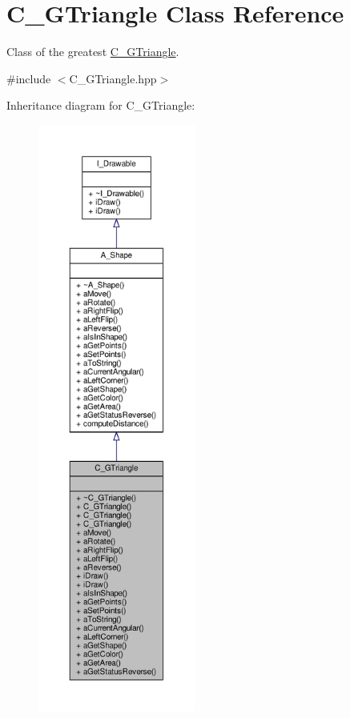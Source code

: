 \hypertarget{classC__GTriangle}{}\section{C\+\_\+\+G\+Triangle Class Reference}
\label{classC__GTriangle}


Class of the greatest \hyperlink{classC__GTriangle}{C\+\_\+\+G\+Triangle}.  




{\ttfamily \#include $<$C\+\_\+\+G\+Triangle.\+hpp$>$}



Inheritance diagram for C\+\_\+\+G\+Triangle\+:\nopagebreak
\begin{figure}[H]
\begin{center}
\leavevmode
\includegraphics[height=550pt]{classC__GTriangle__inherit__graph}
\end{center}
\end{figure}


